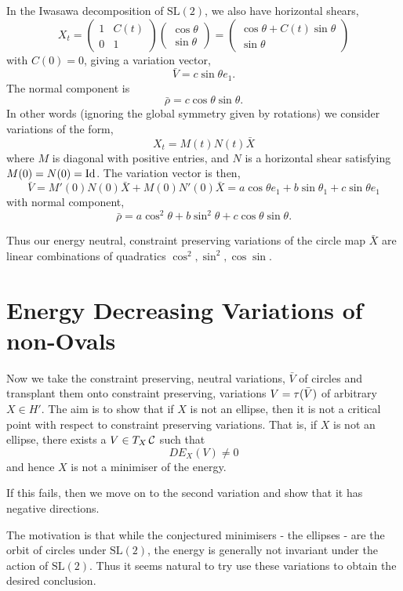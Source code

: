 \documentclass[12pt]{article}
\begin{document}
In the Iwasawa decomposition of \(\text{SL}(2)\), we also have horizontal shears,
\[
X_t = 
\begin{pmatrix}
1 & C(t) \\
0 & 1
\end{pmatrix}
\begin{pmatrix}
\cos \theta \\
\sin \theta
\end{pmatrix}
=
\begin{pmatrix}
\cos\theta + C(t) \sin\theta \\
\sin\theta
\end{pmatrix}
\]
with \(C(0) = 0\), giving a variation vector,
\[
\bar{V} = c \sin\theta e_1.
\]
The normal component is
\[
\bar{\rho} = c \cos\theta \sin\theta.
\]
In other words (ignoring the global symmetry given by rotations) we consider variations of the form,
\[
X_t = M(t) N(t) \bar{X}
\]
where \(M\) is diagonal with positive entries, and \(N\) is a horizontal shear satisfying \(M(0) = N(0) = \operatorname{Id}\). The variation vector is then,
\[
\bar{V} = M'(0) N(0) \bar{X} + M(0) N'(0) \bar{X} = a \cos\theta e_1 + b \sin\theta_1 + c \sin\theta e_1
\]
with normal component,
\[
\bar{\rho} = a \cos^2\theta + b \sin^2 \theta + c \cos\theta \sin\theta.
\]

Thus our energy neutral, constraint preserving variations of the circle map \(\bar{X}\) are linear combinations of quadratics \(\cos^2, \sin^2, \cos \sin\).

\section{Energy Decreasing Variations of non-Ovals}

Now we take the constraint preserving, neutral variations, \(\bar{V}\) of circles and transplant them onto constraint preserving, variations \(V = \operatorname{\tau}(\bar{V})\) of arbitrary \(X \in H'\). The aim is to show that if \(X\) is not an ellipse, then it is not a critical point with respect to constraint preserving variations. That is, if \(X\) is not an ellipse, there exists a \(V \in T_X \operatorname{\mathcal{C}}\) such that
\[
DE_X (V) \ne 0
\]
and hence \(X\) is not a minimiser of the energy.

{\color{red} If this fails, then we move on to the second variation and show that it has negative directions.}

The motivation is that while the conjectured minimisers - the ellipses - are the orbit of circles under \(\text{SL}(2)\), the energy is generally not invariant under the action of \(\text{SL}(2)\). Thus it seems natural to try use these variations to obtain the desired conclusion.
\end{document}
